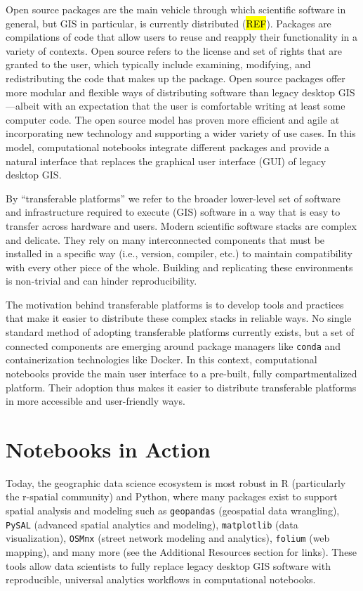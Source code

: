 \documentclass[11pt,letterpaper]{article}
\begin{document}
Open source packages are the main vehicle through which scientific software in general, but GIS in particular, is currently distributed (\hl{REF}). Packages are compilations of code that allow users to reuse and reapply their functionality in a variety of contexts. Open source refers to the license and set of rights that are granted to the user, which typically include examining, modifying, and redistributing the code that makes up the package. Open source packages offer more modular and flexible ways of distributing software than legacy desktop GIS---albeit with an expectation that the user is comfortable writing at least some computer code. The open source model has proven more efficient and agile at incorporating new technology and supporting a wider variety of use cases. In this model, computational notebooks integrate different packages and provide a natural interface that replaces the graphical user interface (GUI) of legacy desktop GIS.

By \enquote{transferable platforms} we refer to the broader lower-level set of software and infrastructure required to execute (GIS) software in a way that is easy to transfer across hardware and users. Modern scientific software stacks are complex and delicate. They rely on many interconnected components that must be installed in a specific way (i.e., version, compiler, etc.) to maintain compatibility with every other piece of the whole. Building and replicating these environments is non-trivial and can hinder reproducibility.

The motivation behind transferable platforms is to develop tools and practices that make it easier to distribute these complex stacks in reliable ways. No single standard method of adopting transferable platforms currently exists, but a set of connected components are emerging around package managers like \texttt{conda} and containerization technologies like Docker. In this context, computational notebooks provide the main user interface to a pre-built, fully compartmentalized platform. Their adoption thus makes it easier to distribute transferable platforms in more accessible and user-friendly ways.

\section{Notebooks in Action}

Today, the geographic data science ecosystem is most robust in R (particularly the r-spatial community) and Python, where many packages exist to support spatial analysis and modeling such as \texttt{geopandas} (geospatial data wrangling), \texttt{PySAL} (advanced spatial analytics and modeling), \texttt{matplotlib} (data visualization), \texttt{OSMnx}  (street network modeling and analytics), \texttt{folium} (web mapping), and many more (see the Additional Resources section for links). These tools allow data scientists to fully replace legacy desktop GIS software with reproducible, universal analytics workflows in computational notebooks.
\end{document}
